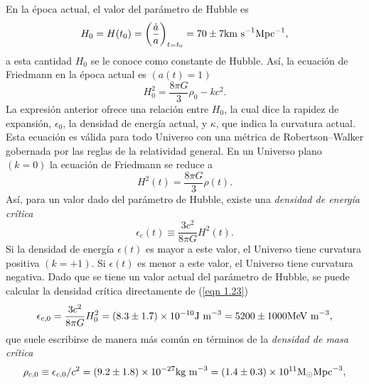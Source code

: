 \documentclass[a4paper,openright,12pt]{book}
\begin{document}
En la época actual, el valor del parámetro de Hubble es
\begin{equation}
H_{0} = H(t_{0}) = \left(\frac{\dot{a}}{a}\right) 
_{t=t_{0}} = 70 \pm 7 \textup{km s}^{-1} \textup{Mpc}^{-1},\label{eqn 1.20}
\end{equation}
a esta cantidad $H_{0}$ se le conoce como constante de Hubble. Así, la ecuación de Friedmann en la época actual es $(a(t) = 1)$ 
\begin{equation}
H_{0}^{2} = \frac{8 \pi G}{3}\rho_{0} 
-k c^{2}. \label{eqn 1.21}
\end{equation}
La expresión anterior ofrece una relación entre $H_{0}$, la cual dice la rapidez de expansión, $\epsilon_{0}$, la densidad de energía actual, y $\kappa$, que indica la curvatura actual. Esta ecuación es válida para todo Universo con una métrica de Robertson--Walker gobernada por las reglas de la relatividad general. En un Universo plano $(k = 0)$ la ecuación de Friedmann se reduce a
\begin{equation}
H^{2}(t)=\frac{8 \pi G}{3}\rho(t).\label{eqn 1.22}
\end{equation}
Así, para un valor dado del parámetro de Hubble, existe una \textit{densidad de energía crítica}
\begin{equation}
\epsilon_{c}(t) \equiv \frac{3 c^{2}}{8 \pi G} H^{2}(t).\label{eqn 1.23}
\end{equation}
Si la densidad de energía $\epsilon(t)$ es mayor a este valor, el Universo tiene curvatura positiva $(k = +1)$. Si $\epsilon(t)$ es menor a este valor, el Universo tiene curvatura negativa. Dado que se tiene un valor actual del parámetro de Hubble, se puede calcular la densidad crítica directamente de (\ref{eqn 1.23})
\begin{equation}
\epsilon_{c,0} = \frac{3 c^{2}}{8 \pi G}H_{0}^{2}
=
(8.3 \pm 1.7) \times 10^{-10} \textup{J m} ^{-3}
=
5200 \pm 1000 \textup{MeV m} ^{-3},\label{eqn 1.24}
\end{equation}
que suele escribirse de manera más común en términos de la \textit{densidad de masa crítica}
\begin{equation}
\rho_{c,0} \equiv \epsilon_{c,0}/c^{2}
=
(9.2 \pm 1.8) \times 10^{-27} \textup{kg m}^{-3}
=
(1.4 \pm 0.3) \times 10^{11} \textup{M}_{\odot} \textup{Mpc}^{-3},\label{eqn 1.25}
\end{equation}
\end{document}
